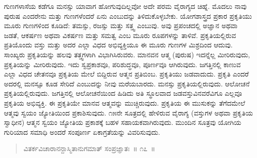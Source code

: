 ಗುಣಗಳಾಸೆಯ ಕಡೆಗೂ ಮನಸ್ಸು ಯಾವಾಗ ಹೋಗುವುದಿಲ್ಲವೋ ಅದೇ ಪರಮ ವೈರಾಗ್ಯದ ಚಿಹ್ನೆ. ಮೊದಲು ನಾವು ಪುರುಷ ಎಂದರೇನು ಮತ್ತು ಗುಣಗಳೆಂದರೆ ಏನು ಎಂಬುದನ್ನು ತಿಳಿದುಕೊಳ್ಳಬೇಕು. ಯೋಗಶಾಸ್ತ್ರದ ಪ್ರಕಾರ ಪ್ರಕೃತಿಯು ಮೂರು ಗುಣಗಳಿಂದ ಕೂಡಿದೆ: ತಮಸ್ಸು, ರಜಸ್ಸು ಮತ್ತು ಸತ್ತ್ವ ಎಂಬುವು. ಅವು ಪ್ರಪಂಚದಲ್ಲಿ ಅಜ್ಞಾನ ಅಥವಾ ಜಡತೆ, ಆಕರ್ಷಣ ಅಥವಾ ವಿಕರ್ಷಣ ಮತ್ತು ಸಮತ್ವ ಎಂಬ ಮೂರು ರೂಪಗಳನ್ನು ತಾಳಿವೆ. ಪ್ರಕೃತಿಯಲ್ಲಿರುವ ಪ್ರತಿಯೊಂದು ವಸ್ತು ಮತ್ತು ಅದರ ಎಲ್ಲಾ ವಿಧದ ಅಭಿವ್ಯಕ್ತಿಯೂ ಈ ಮೂರು ಗುಣಗಳ ಮಿಶ್ರದಿಂದ ಆದುವು. ಸಾಂಖ್ಯರು ಪ್ರಕೃತಿಯನ್ನು ಹಲವು ತತ್ತ್ವಗಳಾಗಿ ವಿಭಾಗಿಸಿರುವರು. ಮಾನವನ ಆತ್ಮ (ಪುರುಷ) ಇದನ್ನೆಲ್ಲ ಮೀರಿರುವುದು, ಪ್ರಕೃತಿಯನ್ನು ಮೀರಿರುವುದು. ಇದು ಸ್ವಪ್ರಕಾಶವೂ, ಪರಿಶುದ್ಧವೂ, ಪೂರ್ಣವೂ ಆಗಿರುವುದು. ಜಗತ್ತಿನಲ್ಲಿ ಕಾಣುವ ಎಲ್ಲಾ ವಿಧದ ಚೇತನವೂ ಪ್ರಕೃತಿಯ ಮೇಲೆ ಬಿದ್ದಿರುವ ಆತ್ಮನ ಪ್ರತಿಬಿಂಬ. ಪ್ರಕೃತಿಯು ಜಡವಾದುದು. ಪ್ರಕೃತಿ ಎಂದರೆ ಅದರಲ್ಲಿ ಮನಸ್ಸೂ ಕೂಡ ಸೇರಿದೆ ಎಂಬುದನ್ನು ನೀವು ಮರೆಯಬಾರದು. ಮನಸ್ಸು ಪ್ರಕೃತಿಯಲ್ಲಿರುವುದು. ಆಲೋಚನೆ ಪ್ರಕೃತಿಯಲ್ಲಿರುವುದು. ಜಗತ್ತಿನಲ್ಲಿ ಆಲೋಚನೆಯಿಂದ ಹಿಡಿದು ಅತಿ ಸ್ಥೂಲವಾದ ಜಡವಸ್ತುವಿನವರೆವಿಗೂ ಎಲ್ಲವೂ ಪ್ರಕೃತಿಯ ಅಭಿವ್ಯಕ್ತಿ. ಈ ಪ್ರಕೃತಿಯೇ ಮಾನವ ಆತ್ಮವನ್ನು ಮುಚ್ಚಿರುವುದು. ಪ್ರಕೃತಿಯ ಈ ಮುಸುಕನ್ನು ತೆಗೆದಮೇಲೆ ಆತ್ಮವು ಸ್ವಯಂ ಜ್ಯೋತಿಯಿಂದ ಪ್ರಕಾಶಿಸುವುದು. ೧೫ನೇ ಸೂತ್ರದಲ್ಲಿ ಹೇಳಿರುವ ವೈರಾಗ್ಯ (ವಸ್ತುಗಳ ಅಥವಾ ಪ್ರಕೃತಿಯ ಸ್ವಾಧೀನ) ಆತ್ಮನ ಸ್ವಯಂ ಜ್ಯೋತಿಯ ಪ್ರಕಾಶಕ್ಕೆ ಬಹಳ ಸಹಾಯಕವಾಗಿರುವುದು. ಮುಂದಿನ ಸೂತ್ರವು ಯೋಗಿಯ ಗುರಿಯಾದ ಸಮಾಧಿ ಅಂದರೆ ಸಂಪೂರ್ಣ ಏಕಾಗ್ರತೆಯನ್ನು ವಿವರಿಸುವುದು. 

\vspace{-0.3cm}

\begin{verse}
ವಿತರ್ಕವಿಚಾರಾನನ್ದಾಸ್ಮಿತಾನುಗಮಾತ್​ ಸಂಪ್ರಜ್ಞಾತಃ~॥ ೧೭~॥
\end{verse}

\vspace{-0.4cm}


\vspace{0.1cm}

